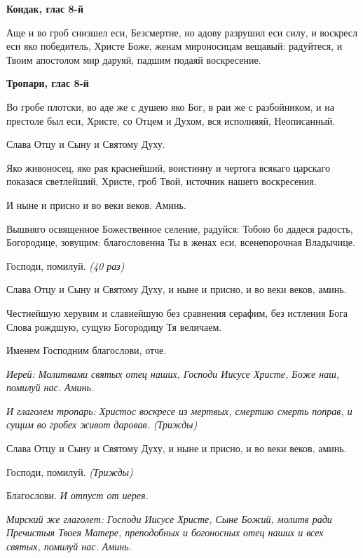 \bfseries Кондак, глас 8-й\normalfont{}


Аще и во гроб снизшел еси, Безсмертне, но адову разрушил еси силу, и воскресл еси яко победитель, Христе Боже, женам мироносицам вещавый: радуйтеся, и Твоим апостолом мир даруяй, падшим подаяй воскресение.





\bfseries Тропари, глас 8-й\normalfont{}


Во гробе плотски, во аде же с душею яко Бог, в раи же с разбойником, и на престоле был еси, Христе, со Отцем и Духом, вся исполняяй, Неописанный.


Слава Отцу и Сыну и Святому Духу.


Яко живоносец, яко рая краснейший, воистинну и чертога всякаго царскаго показася светлейший, Христе, гроб Твой, источник нашего воскресения.


И ныне и присно и во веки веков. Аминь.


Вышняго освященное Божественное селение, радуйся: Тобою бо дадеся радость, Богородице, зовущим: благословенна Ты в женах еси, всенепорочная Владычице.


Господи, помилуй. \itshape (40 раз)\normalfont{}


Слава Отцу и Сыну и Святому Духу, и ныне и присно, и во веки веков, аминь.


Честнейшую херувим и славнейшую без сравнения серафим, без истления Бога Слова рождшую, сущую Богородицу Тя величаем.


Именем Господним благослови, отче.


\itshape Иерей:\normalfont{} Молитвами святых отец наших, Господи Иисусе Христе, Боже наш, помилуй нас. Аминь.


\itshape И глаголем тропарь:\normalfont{} Христос воскресе из мертвых, смертию смерть поправ, и сущим во гробех живот даровав. \itshape (Трижды)\normalfont{}


Слава Отцу и Сыну и Святому Духу, и ныне и присно, и во веки веков, аминь.


Господи, помилуй. \itshape (Трижды)\normalfont{}


Благослови. \itshape И отпуст от иерея.\normalfont{}


\itshape Мирский же глаголет:\normalfont{} Господи Иисусе Христе, Сыне Божий, молитв ради Пречистыя Твоея Матере, преподобных и богоносных отец наших и всех святых, помилуй нас. Аминь.


\medskip


\mychapterending